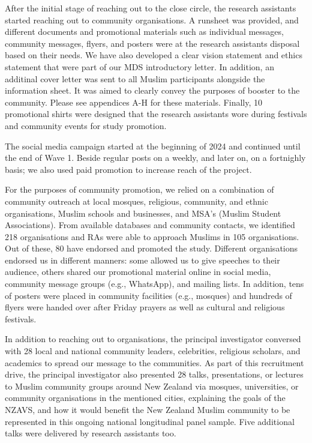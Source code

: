 \documentclass[
]{interact}
\begin{document}
After the initial stage of reaching out to the close circle, the
research assistants started reaching out to community organisations. A
runsheet was provided, and different documents and promotional materials
such as individual messages, community messages, flyers, and posters
were at the research assistants disposal based on their needs. We have
also developed a clear vision statement and ethics statement that were
part of our MDS introductory letter. In addition, an additinal cover
letter was sent to all Muslim participants alongside the information
sheet. It was aimed to clearly convey the purposes of booster to the
community. Please see appendices A-H for these materials. Finally, 10
promotional shirts were designed that the research assistants wore
during festivals and community events for study promotion.

The social media campaign started at the beginning of 2024 and continued
until the end of Wave 1. Beside regular posts on a weekly, and later on,
on a fortnighly basis; we also used paid promotion to increase reach of
the project.

For the purposes of community promotion, we relied on a combination of
community outreach at local mosques, religious, community, and ethnic
organisations, Muslim schools and businesses, and MSA's (Muslim Student
Associations). From available databases and community contacts, we
identified 218 organisations and RAs were able to approach Muslims in
105 organisations. Out of these, 80 have endorsed and promoted the
study. Different organisations endorsed us in different manners: some
allowed us to give speeches to their audience, others shared our
promotional material online in social media, community message groups
(e.g., WhatsApp), and mailing lists. In addition, tens of posters were
placed in community facilities (e.g., mosques) and hundreds of flyers
were handed over after Friday prayers as well as cultural and religious
festivals.

In addition to reaching out to organisations, the principal investigator
conversed with 28 local and national community leaders, celebrities,
religious scholars, and academics to spread our message to the
communities. As part of this recruitment drive, the principal
investigator also presented 28 talks, presentations, or lectures to
Muslim community groups around New Zealand via mosques, universities, or
community organisations in the mentioned cities, explaining the goals of
the NZAVS, and how it would benefit the New Zealand Muslim community to
be represented in this ongoing national longitudinal panel sample. Five
additional talks were delivered by research assistants too.
\end{document}
